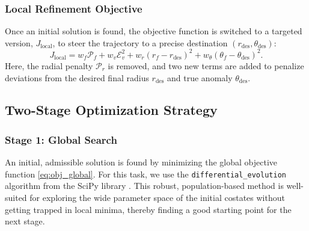 \documentclass[journal, a4paper]{IEEEtran}
\begin{document}
\subsubsection{Local Refinement Objective}
Once an initial solution is found, the objective function is switched to a targeted version, $J_\text{local}$, to steer the trajectory to a precise destination $(r_\text{des}, \theta_\text{des})$:\
\begin{equation}
    J_\text{local} = w_f \mathcal{P}_f + w_v \mathcal{E}_v^2 + w_r (r_f - r_\text{des})^2 + w_\theta (\theta_f - \theta_\text{des})^2.
    \label{eq:obj_local}
\end{equation}
Here, the radial penalty $\mathcal{P}_r$ is removed, and two new terms are added to penalize deviations from the desired final radius $r_\text{des}$ and true anomaly $\theta_\text{des}$.

\subsection{Two-Stage Optimization Strategy}
\subsubsection{Stage 1: Global Search}
An initial, admissible solution is found by minimizing the global objective function \eqref{eq:obj_global}. For this task, we use the \texttt{differential\_evolution} algorithm from the SciPy library \cite{Storn1997}. This robust, population-based method is well-suited for exploring the wide parameter space of the initial costates without getting trapped in local minima, thereby finding a good starting point for the next stage.
\end{document}
